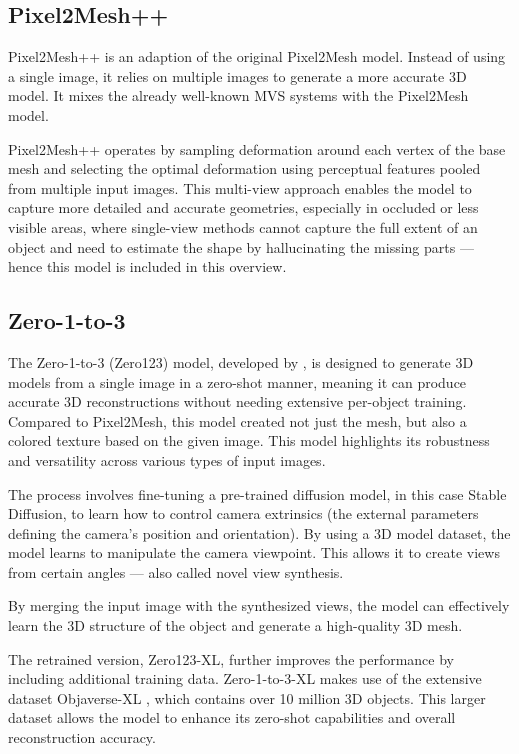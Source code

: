 \subsection{Pixel2Mesh++}
Pixel2Mesh++ \autocite{wen_pixel2mesh_2019} is an adaption of the original Pixel2Mesh model.  Instead of using a single image, it relies on multiple images to generate a more accurate 3D model.
It mixes the already well-known MVS systems with the Pixel2Mesh model.

Pixel2Mesh++ operates by sampling deformation around each vertex of the base mesh and selecting the optimal deformation using perceptual features pooled from multiple input images. This multi-view approach enables the model to capture more detailed and accurate geometries, especially in occluded or less visible areas, where single-view methods cannot capture the full extent of an object and need to estimate the shape by hallucinating the missing parts — hence this model is included in this overview.

\subsection{Zero-1-to-3} \label{section:zero123}
The Zero-1-to-3 (Zero123) model, developed by \textcite{liu_zero-1--3_2023}, is designed to generate 3D models from a single image in a zero-shot manner, meaning it can produce accurate 3D reconstructions without needing extensive per-object training. Compared to Pixel2Mesh, this model created not just the mesh, but also a colored texture based on the given image. This model highlights its robustness and versatility across various types of input images.

The process involves fine-tuning a pre-trained diffusion model, in this case Stable Diffusion, to learn how to control camera extrinsics (the external parameters defining the camera's position and orientation).
By using a 3D model dataset, the model learns to manipulate the camera viewpoint. This allows it to create views from certain angles — also called novel view synthesis.

By merging the input image with the synthesized views, the model can effectively learn the 3D structure of the object and generate a high-quality 3D mesh.

The retrained version, Zero123-XL, further improves the performance by including additional training data. Zero-1-to-3-XL makes use of the extensive dataset Objaverse-XL \autocite{deitke_objaverse-xl_2023}, which contains over 10 million 3D objects.
This larger dataset allows the model to enhance its zero-shot capabilities and overall reconstruction accuracy.

